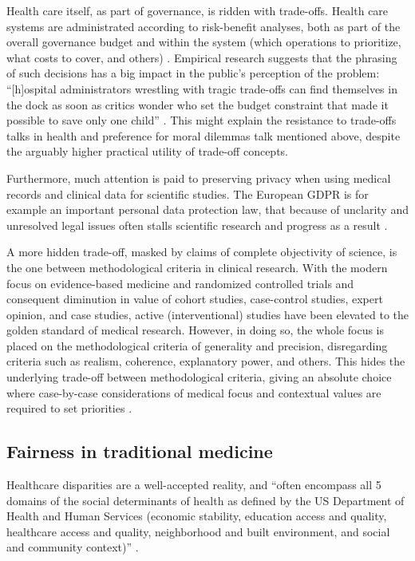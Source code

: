     Health care itself, as part of governance, is ridden with trade-offs.
    Health care systems are administrated according to risk-benefit analyses, both as part of the overall governance budget and within the system (which operations to prioritize, what costs to cover, and others) \cite{Dionne2018}.
    Empirical research suggests that the phrasing of such decisions has a big impact in the public's perception of the problem:
    ``[h]ospital administrators wrestling with tragic trade-offs can find themselves in the dock as soon as critics wonder who set the budget constraint that made it possible to save only one child'' \cite[p.~323]{Tetlock2003}.
    This might explain the resistance to trade-offs talks in health and preference for moral dilemmas talk mentioned above, despite the arguably higher practical utility of trade-off concepts.

    Furthermore, much attention is paid to preserving privacy when using medical records and clinical data for scientific studies.
    The European GDPR is for example an important personal data protection law, that because of unclarity and unresolved legal issues often stalls scientific research and progress as a result \cite{Eiss2020}.

    A more hidden trade-off, masked by claims of complete objectivity of science, is the one between methodological criteria in clinical research.
    With the modern focus on evidence-based medicine and randomized controlled trials and consequent diminution in value of cohort studies, case-control studies, expert opinion, and case studies, active (interventional) studies have been elevated to the golden standard of medical research.
    However, in doing so, the whole focus is placed on the methodological criteria of generality and precision, disregarding criteria such as realism, coherence, explanatory power, and others.
    This hides the underlying trade-off between methodological criteria, giving an absolute choice where case-by-case considerations of medical focus and contextual values are required to set priorities \cite{Ho2011}.

\subsection{Fairness in traditional medicine}
    Healthcare disparities are a well-accepted reality, and ``often encompass all 5 domains of the social determinants of health as defined by the US Department of Health and Human Services (economic stability, education access and quality, healthcare access and quality, neighborhood and built environment, and social and community context)'' \cite[p.~2]{Chen2021}.


